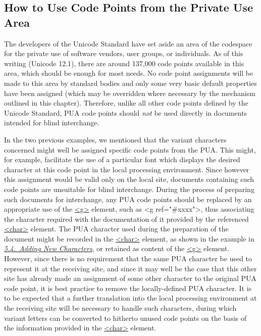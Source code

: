 \subsection[{How to Use Code Points from the Private Use Area}]{How to Use Code Points from the Private Use Area}\label{D25-50}\par
The developers of the Unicode Standard have set aside an area of the codespace for the private use of software vendors, user groups, or individuals. As of this writing (Unicode 12.1), there are around 137,000 code points available in this area, which should be enough for most needs. No code point assignments will be made to this area by standard bodies and only some very basic default properties have been assigned (which may be overridden where necessary by the mechanism outlined in this chapter). Therefore, unlike all other code points defined by the Unicode Standard, PUA code points should \textit{not} be used directly in documents intended for blind interchange. \par
In the two previous examples, we mentioned that the variant characters concerned might well be assigned specific code points from the PUA. This might, for example, facilitate the use of a particular font which displays the desired character at this code point in the local processing environment. Since however this assignment would be valid only on the local site, documents containing such code points are unsuitable for blind interchange. During the process of preparing such documents for interchange, any PUA code points should be replaced by an appropriate use of the \hyperref[TEI.g]{<g>} element, such as <g ref="\#xxxx">, thus associating the character required with the documentation of it provided by the referenced \hyperref[TEI.char]{<char>} element. The PUA character used during the preparation of the document might be recorded in the \hyperref[TEI.char]{<char>} element, as shown in the example in \textit{\hyperref[D25-40]{5.4.\ Adding New Characters}}, or retained as content of the \hyperref[TEI.g]{<g>} element. However, since there is no requirement that the same PUA character be used to represent it at the receiving site, and since it may well be the case that this other site has already made an assignment of some other character to the original PUA code point, it is best practice to remove the locally-defined PUA character. It is to be expected that a further translation into the local processing environment at the receiving site will be necessary to handle such characters, during which variant letters can be converted to hitherto unused code points on the basis of the information provided in the \hyperref[TEI.char]{<char>} element.\par
